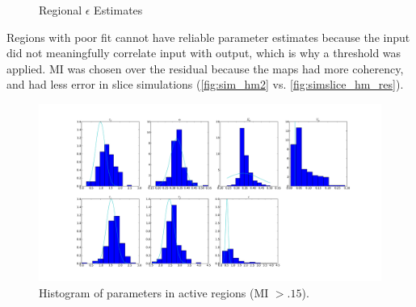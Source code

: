 \begin{figure}[H]
\centering
{}
\caption{Regional $\epsilon$ Estimates}
\label{fig:pmap6}
\end{figure}

Regions with poor fit cannot have reliable parameter estimates because the input did not meaningfully
correlate input with output, which is why a threshold was applied.
\ac{MI} was chosen over the residual because the
maps had more coherency, and had less error in slice simulations (\autoref{fig:sim_hm2} vs.
\autoref{fig:simslice_hm_res}).

\begin{figure}
\centering
\includegraphics[clip=truew,trim=8cm 4cm 8cm 4cm,width=16cm]{images/realhist}
\caption{Histogram of parameters in active regions (\acs{MI} $> .15$).}
\label{fig:realhist}
\end{figure}


